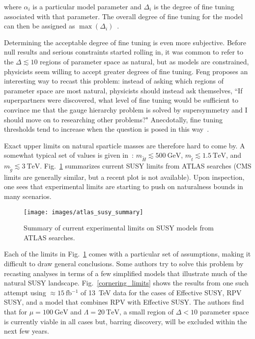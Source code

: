 \documentclass[12pt]{article}
\begin{document}
    \noindent where $\alpha_i$ is a particular model parameter and $\Delta_i$ is the degree of fine tuning associated with that parameter. The overall degree of fine tuning for the model can then be assigned as $\max{\left(\Delta_i\right)}$~\cite{cornering}.

    Determining the acceptable degree of fine tuning is even more subjective. Before null results and serious constraints started rolling in, it was common to refer to the $\Delta \lesssim 10$ regions of parameter space as natural, but as models are constrained, physicists seem willing to accept greater degrees of fine tuning. Feng proposes an interesting way to recast this problem: instead of asking which regions of parameter space are most natural, physicists should instead ask themselves, ``If superpartners were discovered, what level of fine tuning would be sufficient to convince me that the gauge hierarchy problem is solved by supersymmetry and I should move on to researching other problems?" Anecdotally, fine tuning thresholds tend to increase when the question is posed in this way~\cite{feng}.

    Exact upper limits on natural sparticle masses are therefore hard to come by. A somewhat typical set of values is given in~\cite{drees_kim}: $m_{\tilde{H}} \lesssim \SI{500}{\giga\electronvolt}$, $m_{\tilde{t}} \lesssim \SI{1.5}{\tera\electronvolt}$, and $m_{\tilde{g}} \lesssim \SI{3}{\tera\electronvolt}$. Fig.~\ref{atlas_susy_summary} summarizes current SUSY limits from ATLAS searches (CMS limits are generally similar, but a recent plot is not available). Upon inspection, one sees that experimental limits are starting to push on naturalness bounds in many scenarios.

    \noindent \begin{figure}[htbp] \begin{center}
    \texttt{[image: images/atlas\_susy\_summary]}
    \caption{Summary of current experimental limits on SUSY models from ATLAS searches.}
    \label{atlas_susy_summary}
    \end{center} \end{figure}

    Each of the limits in Fig.~\ref{atlas_susy_summary} comes with a particular set of assumptions, making it difficult to draw general conclusions. Some authors try to solve this problem by recasting analyses in terms of a few simplified models that illustrate much of the natural SUSY landscape. Fig.~\ref{cornering_limits} shows the results from one such attempt using $\approx \SI{15}{\femto\barn^{-1}}$ of \SI{13}{\tera\electronvolt} data for the cases of Effective SUSY, RPV SUSY, and a model that combines RPV with Effective SUSY. The authors find that for $\mu = \SI{100}{\giga\electronvolt}$ and $\Lambda = \SI{20}{\tera\electronvolt}$, a small region of $\Delta < 10$ parameter space is currently viable in all cases but, barring discovery, will be excluded within the next few years.
    
\end{document}
